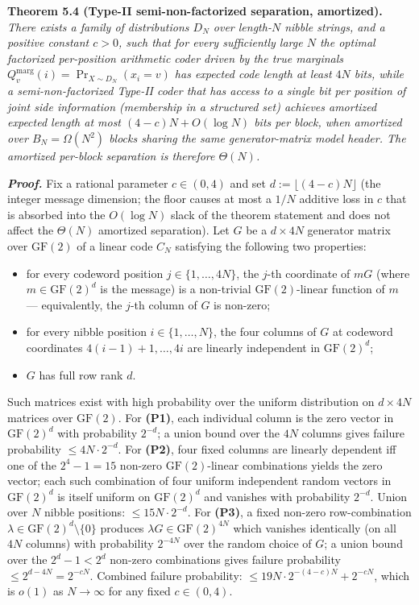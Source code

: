 \documentclass[
]{article}
\begin{document}
\textbf{Theorem 5.4 (Type-II semi-non-factorized separation,
amortized).} \emph{There exists a family of distributions $D_N$ over
length-$N$ nibble strings, and a positive constant $c > 0$, such that
for every sufficiently large $N$ the optimal factorized per-position
arithmetic coder driven by the true marginals
$Q^{\text{marg}}_v(i) = \Pr_{X \sim D_N}(x_i = v)$ has expected code
length at least $4N$ bits, while a semi-non-factorized Type-II coder
that has access to a single bit per position of joint side information
(membership in a structured set) achieves amortized expected length at
most $(4 - c)N + O(\log N)$ bits per block, when amortized over
$B_N = \Omega(N^2)$ blocks sharing the same generator-matrix model
header. The amortized per-block separation is therefore $\Theta(N)$.}

\emph{\textbf{Proof.}} Fix a rational parameter $c \in (0, 4)$ and
set $d := \lfloor (4 - c) N \rfloor$ (the integer message
dimension; the floor causes at most a $1/N$ additive loss in $c$
that is absorbed into the $O(\log N)$ slack of the theorem
statement and does not affect the $\Theta(N)$ amortized separation).
Let $G$ be a $d \times 4N$ generator matrix over $\mathrm{GF}(2)$
of a linear code $C_N$ satisfying the following two properties:
\begin{itemize}
\item[\textbf{(P1)}]
for every codeword position $j \in \{1, \ldots, 4N\}$, the $j$-th
coordinate of $mG$ (where $m \in \mathrm{GF}(2)^d$ is the message)
is a non-trivial $\mathrm{GF}(2)$-linear function of $m$ ---
equivalently, the $j$-th column of $G$ is non-zero;
\item[\textbf{(P2)}]
for every nibble position $i \in \{1, \ldots, N\}$, the four
columns of $G$ at codeword coordinates $4(i-1)+1, \ldots, 4i$ are
linearly independent in $\mathrm{GF}(2)^d$;
\item[\textbf{(P3)}]
$G$ has full row rank $d$.
\end{itemize}
Such matrices exist with high probability over the uniform
distribution on $d \times 4N$ matrices over $\mathrm{GF}(2)$. For
\textbf{(P1)}, each individual column is the zero vector in
$\mathrm{GF}(2)^d$ with probability $2^{-d}$; a union bound over the
$4N$ columns gives failure probability $\leq 4N \cdot 2^{-d}$. For
\textbf{(P2)}, four fixed columns are linearly dependent iff one of
the $2^4 - 1 = 15$ non-zero $\mathrm{GF}(2)$-linear combinations
yields the zero vector; each such combination of four uniform
independent random vectors in $\mathrm{GF}(2)^d$ is itself uniform
on $\mathrm{GF}(2)^d$ and vanishes with probability $2^{-d}$. Union
over $N$ nibble positions: $\leq 15 N \cdot 2^{-d}$. For
\textbf{(P3)}, a fixed non-zero row-combination
$\lambda \in \mathrm{GF}(2)^d \setminus \{0\}$ produces
$\lambda G \in \mathrm{GF}(2)^{4N}$ which vanishes identically (on
all $4N$ columns) with probability $2^{-4N}$ over the random choice
of $G$; a union bound over the $2^d - 1 < 2^d$ non-zero combinations
gives failure probability $\leq 2^{d - 4N} = 2^{-cN}$.
Combined failure probability:
$\leq 19 N \cdot 2^{-(4-c)N} + 2^{-cN}$, which is $o(1)$ as
$N \to \infty$ for any fixed $c \in (0, 4)$.
\end{document}
